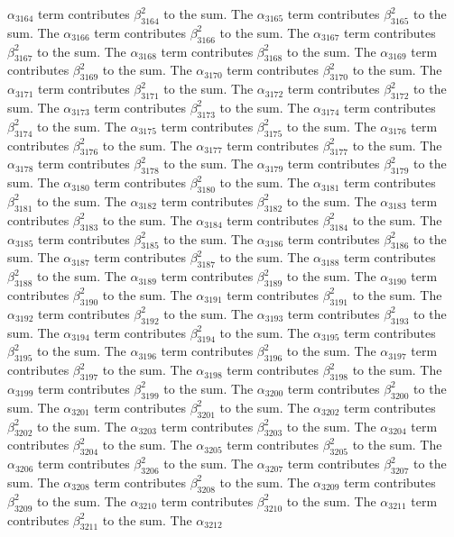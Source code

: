 \begin{lemma}
$\alpha_{3164}$ term contributes $\beta_{3164}^{2}$ to the sum. The $\alpha_{3165}$ term contributes $\beta_{3165}^{2}$ to the sum. The $\alpha_{3166}$ term contributes $\beta_{3166}^{2}$ to the sum. The $\alpha_{3167}$ term contributes $\beta_{3167}^{2}$ to the sum. The $\alpha_{3168}$ term contributes $\beta_{3168}^{2}$ to the sum. The $\alpha_{3169}$ term contributes $\beta_{3169}^{2}$ to the sum. The $\alpha_{3170}$ term contributes $\beta_{3170}^{2}$ to the sum. The $\alpha_{3171}$ term contributes $\beta_{3171}^{2}$ to the sum. The $\alpha_{3172}$ term contributes $\beta_{3172}^{2}$ to the sum. The $\alpha_{3173}$ term contributes $\beta_{3173}^{2}$ to the sum. The $\alpha_{3174}$ term contributes $\beta_{3174}^{2}$ to the sum. The $\alpha_{3175}$ term contributes $\beta_{3175}^{2}$ to the sum. The $\alpha_{3176}$ term contributes $\beta_{3176}^{2}$ to the sum. The $\alpha_{3177}$ term contributes $\beta_{3177}^{2}$ to the sum. The $\alpha_{3178}$ term contributes $\beta_{3178}^{2}$ to the sum. The $\alpha_{3179}$ term contributes $\beta_{3179}^{2}$ to the sum. The $\alpha_{3180}$ term contributes $\beta_{3180}^{2}$ to the sum. The $\alpha_{3181}$ term contributes $\beta_{3181}^{2}$ to the sum. The $\alpha_{3182}$ term contributes $\beta_{3182}^{2}$ to the sum. The $\alpha_{3183}$ term contributes $\beta_{3183}^{2}$ to the sum. The $\alpha_{3184}$ term contributes $\beta_{3184}^{2}$ to the sum. The $\alpha_{3185}$ term contributes $\beta_{3185}^{2}$ to the sum. The $\alpha_{3186}$ term contributes $\beta_{3186}^{2}$ to the sum. The $\alpha_{3187}$ term contributes $\beta_{3187}^{2}$ to the sum. The $\alpha_{3188}$ term contributes $\beta_{3188}^{2}$ to the sum. The $\alpha_{3189}$ term contributes $\beta_{3189}^{2}$ to the sum. The $\alpha_{3190}$ term contributes $\beta_{3190}^{2}$ to the sum. The $\alpha_{3191}$ term contributes $\beta_{3191}^{2}$ to the sum. The $\alpha_{3192}$ term contributes $\beta_{3192}^{2}$ to the sum. The $\alpha_{3193}$ term contributes $\beta_{3193}^{2}$ to the sum. The $\alpha_{3194}$ term contributes $\beta_{3194}^{2}$ to the sum. The $\alpha_{3195}$ term contributes $\beta_{3195}^{2}$ to the sum. The $\alpha_{3196}$ term contributes $\beta_{3196}^{2}$ to the sum. The $\alpha_{3197}$ term contributes $\beta_{3197}^{2}$ to the sum. The $\alpha_{3198}$ term contributes $\beta_{3198}^{2}$ to the sum. The $\alpha_{3199}$ term contributes $\beta_{3199}^{2}$ to the sum. The $\alpha_{3200}$ term contributes $\beta_{3200}^{2}$ to the sum. The $\alpha_{3201}$ term contributes $\beta_{3201}^{2}$ to the sum. The $\alpha_{3202}$ term contributes $\beta_{3202}^{2}$ to the sum. The $\alpha_{3203}$ term contributes $\beta_{3203}^{2}$ to the sum. The $\alpha_{3204}$ term contributes $\beta_{3204}^{2}$ to the sum. The $\alpha_{3205}$ term contributes $\beta_{3205}^{2}$ to the sum. The $\alpha_{3206}$ term contributes $\beta_{3206}^{2}$ to the sum. The $\alpha_{3207}$ term contributes $\beta_{3207}^{2}$ to the sum. The $\alpha_{3208}$ term contributes $\beta_{3208}^{2}$ to the sum. The $\alpha_{3209}$ term contributes $\beta_{3209}^{2}$ to the sum. The $\alpha_{3210}$ term contributes $\beta_{3210}^{2}$ to the sum. The $\alpha_{3211}$ term contributes $\beta_{3211}^{2}$ to the sum. The $\alpha_{3212}$ 
\end{lemma}
